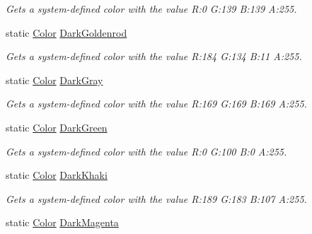 \begin{DoxyCompactItemize}
\begin{DoxyCompactList}\small\item\em Gets a system-\/defined color with the value R\+:0 G\+:139 B\+:139 A\+:255.\end{DoxyCompactList}\item 
static \hyperlink{structMicrosoft_1_1Xna_1_1Framework_1_1Color}{Color} \hyperlink{structMicrosoft_1_1Xna_1_1Framework_1_1Color_a01f7b42070288061fd2f676d1c2239e4}{Dark\+Goldenrod}
\begin{DoxyCompactList}\small\item\em Gets a system-\/defined color with the value R\+:184 G\+:134 B\+:11 A\+:255.\end{DoxyCompactList}\item 
static \hyperlink{structMicrosoft_1_1Xna_1_1Framework_1_1Color}{Color} \hyperlink{structMicrosoft_1_1Xna_1_1Framework_1_1Color_a0fa98db8de4f25fad389e3229e766b33}{Dark\+Gray}
\begin{DoxyCompactList}\small\item\em Gets a system-\/defined color with the value R\+:169 G\+:169 B\+:169 A\+:255.\end{DoxyCompactList}\item 
static \hyperlink{structMicrosoft_1_1Xna_1_1Framework_1_1Color}{Color} \hyperlink{structMicrosoft_1_1Xna_1_1Framework_1_1Color_af9cecdf4f2189411cbebdd93554db248}{Dark\+Green}
\begin{DoxyCompactList}\small\item\em Gets a system-\/defined color with the value R\+:0 G\+:100 B\+:0 A\+:255.\end{DoxyCompactList}\item 
static \hyperlink{structMicrosoft_1_1Xna_1_1Framework_1_1Color}{Color} \hyperlink{structMicrosoft_1_1Xna_1_1Framework_1_1Color_a15e4b1698c04e3782733418c6b93d00d}{Dark\+Khaki}
\begin{DoxyCompactList}\small\item\em Gets a system-\/defined color with the value R\+:189 G\+:183 B\+:107 A\+:255.\end{DoxyCompactList}\item 
static \hyperlink{structMicrosoft_1_1Xna_1_1Framework_1_1Color}{Color} \hyperlink{structMicrosoft_1_1Xna_1_1Framework_1_1Color_a9b99e13875699aa78d7c81e023f94c23}{Dark\+Magenta}

\end{DoxyCompactItemize}
